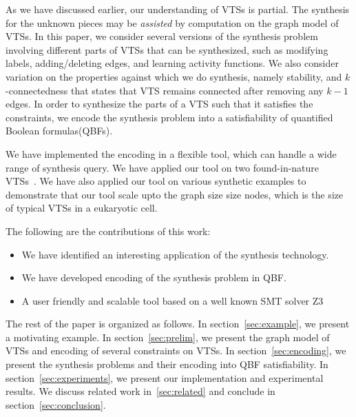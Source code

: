 %
As we have discussed earlier, our understanding of VTSs is partial.
%
%
%
%
The synthesis for the unknown pieces may be {\em assisted} by computation on
the graph model of VTSs.
%
In this paper, we consider several versions of the synthesis problem
involving different parts of VTSs that can be synthesized, such as
modifying labels, adding/deleting edges, and learning activity functions.
%
We also consider variation on the properties against which we do
synthesis, namely stability, and $k$-connectedness that states that
VTS remains connected after removing any $k-1$ edges.
%
In order to synthesize the parts of a VTS such that it satisfies the
constraints, we encode the synthesis problem into a satisfiability of
quantified Boolean formulas(QBFs). 
%

We have implemented the encoding in a flexible tool,
which can handle a wide range of synthesis query.
%
We have applied our tool on two found-in-nature
VTSs~\cite{burri2004complete}.
%
We have also applied our tool on various synthetic examples to
demonstrate that our tool scale upto the graph size size nodes, which
is the size of typical VTSs in a eukaryotic cell.

The following are the contributions of this work:
\begin{itemize}
\item We have identified an interesting application of
  the synthesis technology.
\item We have developed encoding of the synthesis problem in QBF.
\item A user friendly and scalable tool based on a well known SMT solver Z3
\end{itemize}

The rest of the paper is organized as follows.
%
In section~\ref{sec:example}, we present a motivating example.
%
In section~\ref{sec:prelim}, we present the graph model of VTSs and encoding of several
constraints on VTSs.
%
In section~\ref{sec:encoding}, we present the synthesis problems and their
encoding into QBF satisfiability.
%
In section~\ref{sec:experiments}, we present our implementation and experimental results.
%
We discuss related work in~\ref{sec:related} and conclude in section~\ref{sec:conclusion}.



